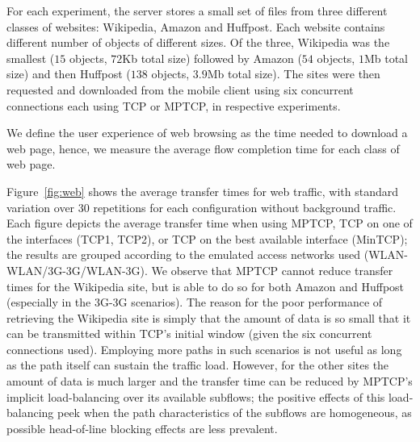 For each experiment, the server stores a small set of files from three different classes
of websites: Wikipedia, Amazon and Huffpost. Each website contains different number of objects of different sizes. Of the three, Wikipedia was the smallest ($15$ objects, $72$Kb total size) followed by Amazon ($54$ objects, $1$Mb total size) and then Huffpost ($138$ objects, $3.9$Mb total size). The sites were then requested and downloaded from the mobile client using six concurrent connections each using TCP or MPTCP, in respective
experiments.

We define the user experience of web browsing as the time needed to download a web page, hence, we measure the average flow completion time for each class of web page.




%

Figure~\ref{fig:web} shows the average transfer times for web traffic, with
standard variation over $30$ repetitions for each configuration without background traffic. Each figure depicts the average
transfer time when using MPTCP, TCP on one of the interfaces (TCP1, TCP2), or
TCP on the best available interface (MinTCP); the results are grouped according
to the emulated access networks used (WLAN-WLAN/3G-3G/WLAN-3G). We observe that MPTCP
cannot reduce transfer times for the Wikipedia site, but is able to do so for
both Amazon and Huffpost (especially in the 3G-3G scenarios). The reason for the
poor performance of retrieving the Wikipedia site is simply that
the amount of data is so small that it can be transmitted
within TCP's initial window (given the six concurrent connections used).
Employing more paths in such scenarios is not useful as long as the path itself
can sustain the traffic load. However, for the other sites the amount of data is
much larger and the transfer time can be reduced by MPTCP's implicit load-balancing
over its available subflows; the positive effects of this load-balancing peek
when the path characteristics of the subflows are homogeneous, as possible
head-of-line blocking effects are less prevalent.

